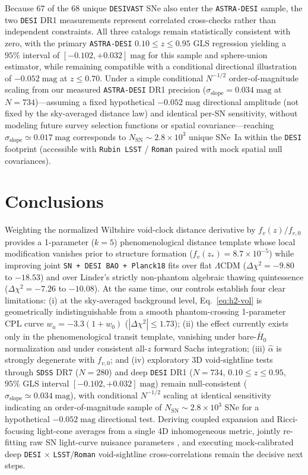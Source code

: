 \documentclass[11pt,a4paper]{article}
\begin{document}
Because $67$ of the $68$ unique \texttt{DESIVAST} SNe also enter the \texttt{ASTRA-DESI} sample, the two \texttt{DESI} DR1 measurements represent correlated cross-checks rather than independent constraints. All three catalogs remain statistically consistent with zero, with the primary \texttt{ASTRA-DESI} $0.10 \le z \le 0.95$ GLS regression yielding a $95\%$ interval of $[-0.102, +0.032]\;\mathrm{mag}$ for this sample and sphere-union estimator, while remaining compatible with a conditional directional illustration of $-0.052\;\mathrm{mag}$ at $z \le 0.70$. Under a simple conditional $N^{-1/2}$ order-of-magnitude scaling from our measured \texttt{ASTRA-DESI} DR1 precision ($\sigma_{\mathrm{slope}} = 0.034\;\mathrm{mag}$ at $N = 734$)---assuming a fixed hypothetical $-0.052\;\mathrm{mag}$ directional amplitude (not fixed by the sky-averaged distance law) and identical per-SN sensitivity, without modeling future survey selection functions or spatial covariance---reaching $\sigma_{\mathrm{slope}} \simeq 0.017\;\mathrm{mag}$ corresponds to $N_{\mathrm{SN}} \sim 2.8 \times 10^3$ unique SNe~Ia within the \texttt{DESI} footprint (accessible with \texttt{Rubin LSST} / \texttt{Roman} paired with mock spatial null covariances).

\section{Conclusions}
Weighting the normalized Wiltshire void-clock distance derivative by $f_v(z)/f_{v,0}$ provides a 1-parameter ($k = 5$) phenomenological distance template whose local modification vanishes prior to structure formation ($f_v(z_*) = 8.7\times 10^{-5}$) while improving joint \texttt{SN + DESI BAO + Planck18} fits over flat $\Lambda$CDM ($\Delta\chi^2 = -9.80$ to $-18.53$) and over Linder's strictly non-phantom algebraic thawing quintessence ($\Delta\chi^2 = -7.26$ to $-10.08$). At the same time, our controls establish four clear limitations: (i) at the sky-averaged background level, Eq.~\eqref{eq:h2-vol} is geometrically indistinguishable from a smooth phantom-crossing 1-parameter CPL curve $w_a = -3.3(1+w_0)$ ($|\Delta\chi^2| \le 1.73$); (ii) the effect currently exists only in the phenomenological transit template, vanishing under bare-$\bar{H}_0$ normalization and under consistent all-$z$ forward Sachs integration; (iii) $\hat{\alpha}$ is strongly degenerate with $f_{v,0}$; and (iv) exploratory 3D void-sightline tests through \texttt{SDSS} DR7 ($N = 280$) and deep \texttt{DESI} DR1 ($N = 734$, $0.10 \le z \le 0.95$, $95\%$ GLS interval $[-0.102, +0.032]\;\mathrm{mag}$) remain null-consistent ($\sigma_{\mathrm{slope}} \simeq 0.034\;\mathrm{mag}$), with conditional $N^{-1/2}$ scaling at identical sensitivity indicating an order-of-magnitude sample of $N_{\mathrm{SN}} \sim 2.8 \times 10^3$ SNe for a hypothetical $-0.052\;\mathrm{mag}$ directional test. Deriving coupled expansion and Ricci-focusing light-cone averages from a single 4D inhomogeneous metric, jointly re-fitting raw SN light-curve nuisance parameters \cite{LaneWiltshire2025MNRAS,SeifertWiltshire2025MNRAS}, and executing mock-calibrated deep \texttt{DESI} $\times$ \texttt{LSST}/\texttt{Roman} void-sightline cross-correlations remain the decisive next steps.
\end{document}
